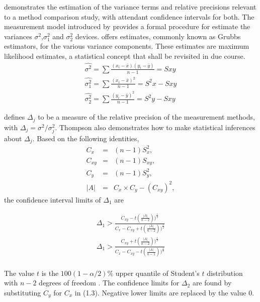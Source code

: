 \documentclass[Main.tex]{subfiles}
\begin{document}
\citet{Kinsella} demonstrates the estimation of the variance terms and relative precisions relevant to a method comparison study, with attendant confidence intervals for both. The measurement model introduced by \citet{Grubbs48,Grubbs73} provides a formal procedure for estimate the variances $\sigma^2$,$\sigma^2_{1}$ and $\sigma^2_{2}$ devices. \citet{Grubbs48} offers estimates, commonly known as Grubbs estimators, for the various variance components. These estimates are maximum likelihood estimates, a statistical concept that shall be revisited in due course.
\begin{eqnarray*}
	\hat{\sigma^{2}} = \sum{\frac{(x_{i}-\bar{x})(y_{i}-\bar{y})}{n-1}} = Sxy\\
	\hat{\sigma^{2}_{1}} = \sum{\frac{(x_{i}-\bar{x})^{2}}{n-1}} =S^{2}x - Sxy  \\
	\hat{\sigma^{2}_{2}} =
	\sum{\frac{(y_{i}-\bar{y})^{2}}{n-1}} = S^{2}y - Sxy
\end{eqnarray*}


\citet{Thompson} defines $\Delta_{j}$ to be a measure of the
relative precision of the measurement methods, with $\Delta_{j}=
\sigma^2/\sigma^2_{j}$. Thompson also demonstrates how to make statistical inferences about $\Delta_{j}$.
Based on the following identities,
\begin{eqnarray*}
	C_{x}&=&(n-1)S^2_{x},\nonumber\\
	C_{xy}&=&(n-1)S_{xy},\nonumber\\
	C_{y}&=&(n-1)S^2_{y},\nonumber\\
	|A| &=& C_{x}\times C_{y} - (C_{xy})^2,\nonumber
\end{eqnarray*}
\noindent the confidence interval limits of $\Delta_{1}$ are

\begin{eqnarray}
\Delta_{1} > \frac{C_{xy}-
	t(\frac{|A|}{n-2}))^{\frac{1}{2}}}{C_{x}-C_{xy}+
	t(\frac{|A|}{n-2}))^{\frac{1}{2}}} \\
\Delta_{1} > \frac{C_{xy}+
	t(\frac{|A|}{n-2}))^{\frac{1}{2}}}{C_{x}-C_{xy}-
	t(\frac{|A|}{n-1}))^{\frac{1}{2}}} \nonumber
\end{eqnarray}
\\ The value $t$ is the $100(1-\alpha/2)\%$ upper quantile of
Student's $t$ distribution with $n-2$ degrees of freedom
\citep{Kinsella}. The confidence limits for $\Delta_{2}$ are found by substituting $C_{y}$ for $C_{x}$ in (1.3).
Negative lower limits are replaced by the value $0$.
\end{document}
